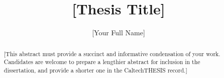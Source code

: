 \documentclass[12pt]{caltech_thesis}
\begin{document}
\title{[Thesis Title]}
\author{[Your Full Name]}

\address{Pasadena, California}                     %



\maketitle

\begin{acknowledgements} 	 
\end{acknowledgements}

\begin{abstract}
   [This abstract must provide a succinct and informative condensation of your work. Candidates are welcome to prepare a lengthier abstract for inclusion in the dissertation, and provide a shorter one in the CaltechTHESIS record.]
\end{abstract}

\begin{publishedcontent}%
\nocite{Cahn:etal:2015,Cahn:etal:2016}
\end{publishedcontent}
\end{document}
